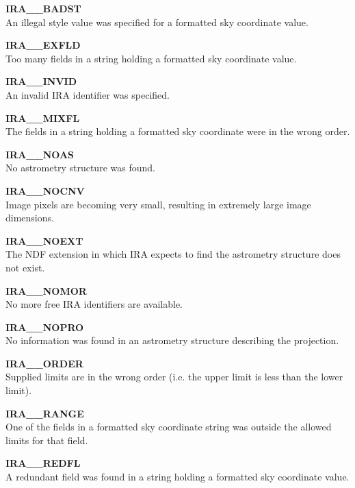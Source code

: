 \begin{description}
\item {\bf IRA\_\_BADST   }\\  
An illegal style value was specified for a formatted sky coordinate value.

\item {\bf IRA\_\_EXFLD   }\\  
Too many fields in a string holding a formatted sky coordinate value.

\item {\bf IRA\_\_INVID   }\\  
An invalid IRA identifier was specified.

\item {\bf IRA\_\_MIXFL   }\\  
The fields in a string holding a formatted sky coordinate were in the wrong 
order.

\item {\bf IRA\_\_NOAS    }\\  
No astrometry structure was found.

\item {\bf IRA\_\_NOCNV   }\\  
Image pixels are becoming very small, resulting in extremely large image dimensions.

\item {\bf IRA\_\_NOEXT   }\\  
The NDF extension in which IRA expects to find the astrometry structure does 
not exist.

\item {\bf IRA\_\_NOMOR   }\\  
No more free IRA identifiers are available.

\item {\bf IRA\_\_NOPRO   }\\  
No information was found in an astrometry structure describing the projection.

\item {\bf IRA\_\_ORDER   }\\  
Supplied limits are in the wrong order (i.e. the upper limit is less than the
lower limit). 

\item {\bf IRA\_\_RANGE   }\\  
One of the fields in a formatted sky coordinate string was outside the allowed
limits for that field.

\item {\bf IRA\_\_REDFL   }\\  
A redundant field was found in a string holding a formatted sky coordinate value.


\end{description}
